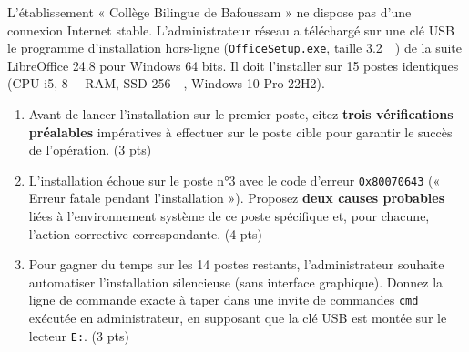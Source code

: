 \documentclass[11pt]{article}
\begin{document}
\begin{exercice}
L'établissement « Collège Bilingue de Bafoussam » ne dispose pas d'une connexion Internet stable. L'administrateur réseau a téléchargé sur une clé USB le programme d'installation hors-ligne (\texttt{OfficeSetup.exe}, taille \SI{3,2}{\giga\byte}) de la suite LibreOffice 24.8 pour Windows 64 bits. Il doit l'installer sur 15 postes identiques (CPU i5, \SI{8}{\giga\byte} RAM, SSD \SI{256}{\giga\byte}, Windows 10 Pro 22H2).

\begin{enumerate}
    \item Avant de lancer l'installation sur le premier poste, citez \textbf{trois vérifications préalables} impératives à effectuer sur le poste cible pour garantir le succès de l'opération. (3 pts)
    \item L'installation échoue sur le poste n°3 avec le code d'erreur \texttt{0x80070643} (« Erreur fatale pendant l'installation »). Proposez \textbf{deux causes probables} liées à l'environnement système de ce poste spécifique et, pour chacune, l'action corrective correspondante. (4 pts)
    \item Pour gagner du temps sur les 14 postes restants, l'administrateur souhaite automatiser l'installation silencieuse (sans interface graphique). Donnez la ligne de commande exacte à taper dans une invite de commandes \texttt{cmd} exécutée en administrateur, en supposant que la clé USB est montée sur le lecteur \texttt{E:}. (3 pts)
\end{enumerate}
\end{exercice}
\end{document}
